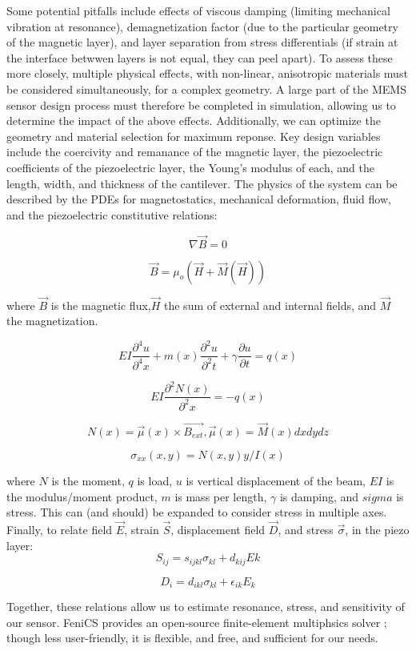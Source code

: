  Some potential pitfalls include effects of viscous damping (limiting mechanical vibration at resonance), demagnetization factor (due to the particular geometry of the magnetic layer), and layer separation from stress differentials (if strain at the interface betwwen layers is not equal, they can peel apart). To assess these more closely, multiple physical effects, with non-linear, anisotropic materials must be considered simultaneously, for a complex geometry. A large part of the MEMS sensor design process must therefore be completed in simulation, allowing us to determine the impact of the above effects. Additionally, we can optimize the geometry and material selection for maximum reponse. Key design variables include the coercivity and remanance of the magnetic layer, the piezoelectric coefficients of the piezoelectric layer, the Young's modulus of each, and the length, width, and thickness of the cantilever. The physics of the system can be described by the PDEs for magnetostatics, mechanical deformation, fluid flow, and the piezoelectric constitutive relations:

 $$ \nabla \vec{B} = 0$$

 $$ \vec{B} = \mu_o(\vec{H}+\vec{M}(\vec{H}))$$

where $\vec{B}$ is the magnetic flux,$\vec{H}$ the sum of external and internal fields, and $\vec{M}$ the magnetization.
 
 $$ EI\frac{\partial^4u}{\partial^4x}+m(x)\frac{\partial^2u}{\partial^2t}+\gamma\frac{\partial u}{\partial t}=q(x)$$

 $$ EI\frac{\partial^2N(x)}{\partial^2x} = -q(x)$$
 
$$ N(x) = \vec{\mu}(x) \times \vec{B_{ext}}, \vec{\mu}(x) = \vec{M}(x)dxdydz $$

$$\sigma_{xx}(x,y)  = N(x,y)y/I(x)$$

where $N$ is the moment, $q$ is load, $u$ is vertical displacement of the beam, $EI$ is the modulus/moment product, $m$ is mass per length, $\gamma$ is damping, and $sigma$ is stress. This can (and should) be expanded to consider stress in multiple axes.
Finally, to relate field $\vec{E}$, strain $\vec{S}$, displacement field $\vec{D}$, and stress $\vec{\sigma}$, in the piezo layer:
 $$S_{ij} = s_{ijkl}\sigma_{kl}+d_{kij}E{k}$$

$$D_i=d_{ikl}\sigma_{kl}+\epsilon_{ik}E_{k}$$
 
Together, these relations allow us to estimate resonance, stress, and sensitivity of our sensor. FeniCS provides an open-source finite-element multiphsics solver \cite{dupont2003fenics}; though less user-friendly, it is flexible, and free, and sufficient for our needs.
 
